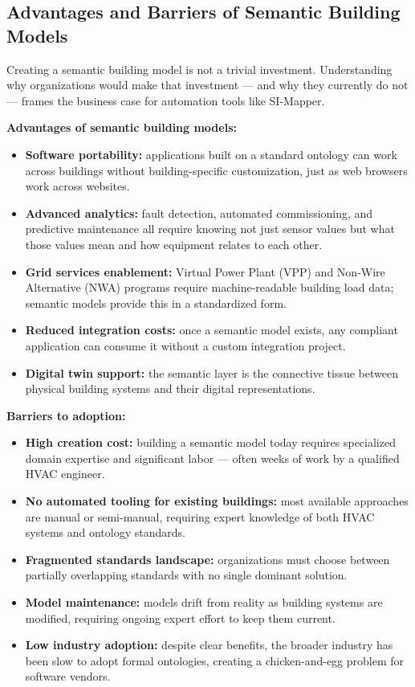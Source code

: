 \subsection{Advantages and Barriers of Semantic Building Models}
\label{subsec:advantages-barriers}

Creating a semantic building model is not a trivial investment.
Understanding why organizations would make that investment --- and why they currently do not ---
frames the business case for automation tools like SI-Mapper.

\textbf{Advantages of semantic building models:}

\begin{itemize}[leftmargin=*, itemsep=2pt]
  \item \textbf{Software portability:} applications built on a standard ontology can work across
        buildings without building-specific customization, just as web browsers work across websites.
  \item \textbf{Advanced analytics:} fault detection, automated commissioning, and predictive
        maintenance all require knowing not just sensor values but what those values mean and how
        equipment relates to each other.
  \item \textbf{Grid services enablement:} Virtual Power Plant (VPP) and Non-Wire Alternative (NWA)
        programs require machine-readable building load data; semantic models provide this in a
        standardized form.
  \item \textbf{Reduced integration costs:} once a semantic model exists, any compliant application
        can consume it without a custom integration project.
  \item \textbf{Digital twin support:} the semantic layer is the connective tissue between physical
        building systems and their digital representations.
\end{itemize}

\textbf{Barriers to adoption:}

\begin{itemize}[leftmargin=*, itemsep=2pt]
  \item \textbf{High creation cost:} building a semantic model today requires specialized domain
        expertise and significant labor --- often weeks of work by a qualified HVAC engineer.
  \item \textbf{No automated tooling for existing buildings:} most available approaches are manual
        or semi-manual, requiring expert knowledge of both HVAC systems and ontology standards.
  \item \textbf{Fragmented standards landscape:} organizations must choose between partially
        overlapping standards with no single dominant solution.
  \item \textbf{Model maintenance:} models drift from reality as building systems are modified,
        requiring ongoing expert effort to keep them current.
  \item \textbf{Low industry adoption:} despite clear benefits, the broader industry has been slow
        to adopt formal ontologies, creating a chicken-and-egg problem for software vendors.
\end{itemize}

